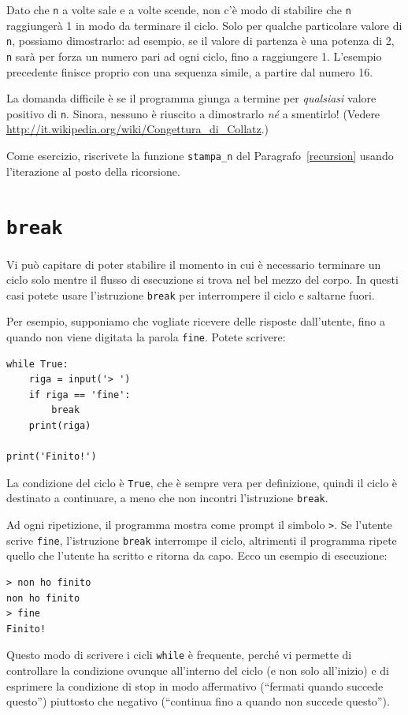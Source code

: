 \documentclass[10pt]{book}
\begin{document}
Dato che {\tt n} a volte sale e a volte scende, non c'è modo di stabilire che {\tt n} raggiungerà 1 in modo da terminare il ciclo. Solo per qualche particolare valore di {\tt n}, possiamo dimostrarlo: ad esempio, se il valore di partenza è una potenza di 2, {\tt n} sarà per forza un numero pari ad ogni ciclo, fino a raggiungere 1. L'esempio precedente finisce proprio con una sequenza simile, a partire dal numero 16.

La domanda difficile è se il programma giunga a termine per {\em qualsiasi} valore positivo di {\tt n}. Sinora, nessuno è riuscito a dimostrarlo {\em né} a smentirlo!  (Vedere \url{http://it.wikipedia.org/wiki/Congettura_di_Collatz}.)

Come esercizio, riscrivete la funzione \verb"stampa_n" del Paragrafo~\ref{recursion} usando l'iterazione al posto della ricorsione.




\section{{\tt break}}

Vi può capitare di poter stabilire il momento in cui è necessario terminare un ciclo solo mentre il flusso di esecuzione si trova nel bel mezzo del corpo. In questi casi potete usare l'istruzione {\tt break} per interrompere il ciclo e saltarne fuori.

Per esempio, supponiamo che vogliate ricevere delle risposte dall'utente, fino a quando non viene digitata la parola {\tt fine}.  Potete scrivere:

\begin{verbatim}
while True:
    riga = input('> ')
    if riga == 'fine':
        break
    print(riga)

print('Finito!')
\end{verbatim}
%
La condizione del ciclo è {\tt True}, che è sempre vera per definizione, quindi il ciclo è destinato a continuare, a meno che non incontri l'istruzione {\tt break}.

Ad ogni ripetizione, il programma mostra come prompt il simbolo {\tt >}.
Se l'utente scrive {\tt fine}, l'istruzione {\tt break} interrompe il ciclo, altrimenti il programma ripete quello che l'utente ha scritto e ritorna da capo. Ecco un esempio di esecuzione:

\begin{verbatim}
> non ho finito
non ho finito
> fine
Finito!
\end{verbatim}
%
Questo modo di scrivere i cicli {\tt while} è frequente, perché vi permette di controllare la condizione ovunque all'interno del ciclo (e non solo all'inizio) e di esprimere la condizione di stop in modo affermativo (``fermati quando succede questo'') piuttosto che negativo (``continua fino a quando non succede questo'').
\end{document}
